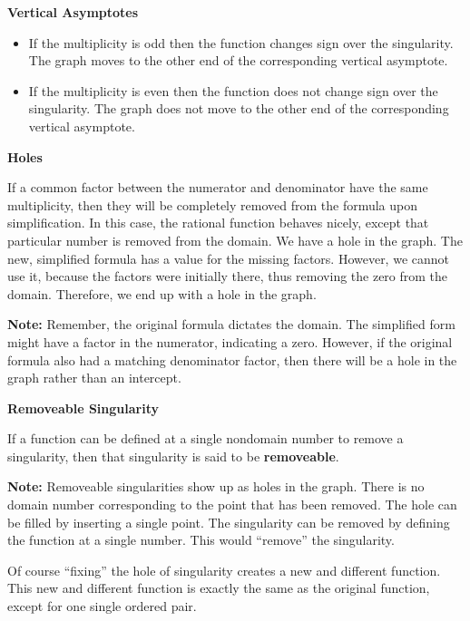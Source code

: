 \documentclass{ximera}
\begin{document}
\textbf{Vertical Asymptotes}

\begin{itemize}
\item If the multiplicity is odd then the function changes sign over the singularity.  The graph moves to the other end of the corresponding vertical asymptote.
\item If the multiplicity is even then the function does not change sign over the singularity.  The graph does not move to the other end of the corresponding vertical asymptote. 
\end{itemize}



\textbf{Holes}


If a common factor between the numerator and denominator have the same multiplicity, then they will be completely removed from the formula upon simplification.  In this case, the rational function behaves nicely, except that particular number is removed from the domain.  We have a hole in the graph.  The new, simplified formula has a value for the missing factors.  However, we cannot use it, because the factors were initially there, thus removing the zero from the domain.  Therefore, we end up with a hole in the graph. 



\textbf{Note:} Remember, the original formula dictates the domain. The simplified form might have a factor in the numerator, indicating a zero. However, if the original formula also had a matching denominator factor, then there will be a hole in the graph rather than an intercept. 






\begin{definition} \textbf{\textcolor{green!50!black}{Removeable Singularity}}

If a function can be defined at a single nondomain number to remove a singularity, then that singularity is said to be \textbf{removeable}.

\end{definition}

\textbf{Note:} Removeable singularities show up as holes in the graph.  There is no domain number corresponding to the point that has been removed. The hole can be filled by inserting a single point.  The singularity can be removed by defining the function at a single number.  This would ``remove'' the singularity. 

Of course ``fixing'' the hole of singularity creates a new and different function.  This new and different function is exactly the same as the original function, except for one single ordered pair.
\end{document}
